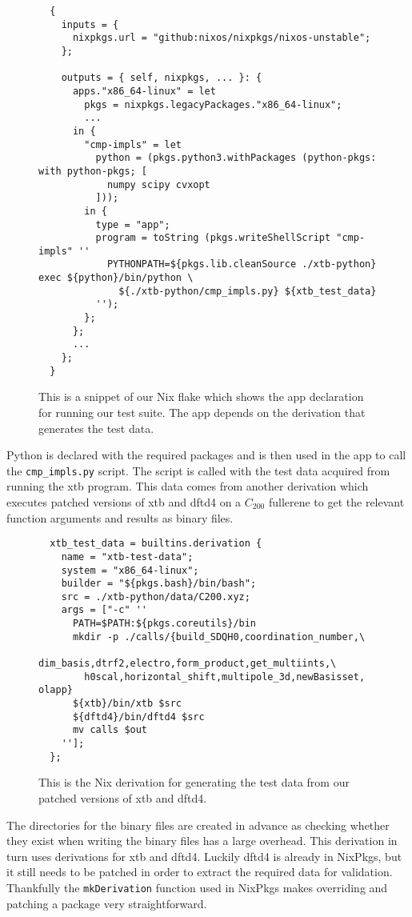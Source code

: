 \begin{figure}[H]
\begin{verbatim}
  {
    inputs = {
      nixpkgs.url = "github:nixos/nixpkgs/nixos-unstable";
    };

    outputs = { self, nixpkgs, ... }: {
      apps."x86_64-linux" = let
        pkgs = nixpkgs.legacyPackages."x86_64-linux";
        ...
      in {
        "cmp-impls" = let
          python = (pkgs.python3.withPackages (python-pkgs: with python-pkgs; [
            numpy scipy cvxopt
          ]));
        in {
          type = "app";
          program = toString (pkgs.writeShellScript "cmp-impls" ''
            PYTHONPATH=${pkgs.lib.cleanSource ./xtb-python} exec ${python}/bin/python \
              ${./xtb-python/cmp_impls.py} ${xtb_test_data}
          '');
        };
      };
      ...
    };
  }
\end{verbatim}
\caption{This is a snippet of our Nix flake which shows the app declaration for running our test suite. The app depends on the derivation that generates the test data.}
\label{fig:nix-flake}
\end{figure}

Python is declared with the required packages and is then used in the app to call the \verb|cmp_impls.py| script. The script is called with the test data acquired from running the xtb program. This data comes from another derivation which executes patched versions of xtb and dftd4 on a $C_{200}$ fullerene to get the relevant function arguments and results as binary files.

\begin{figure}[H]
\begin{verbatim}
  xtb_test_data = builtins.derivation {
    name = "xtb-test-data";
    system = "x86_64-linux";
    builder = "${pkgs.bash}/bin/bash";
    src = ./xtb-python/data/C200.xyz;
    args = ["-c" ''
      PATH=$PATH:${pkgs.coreutils}/bin
      mkdir -p ./calls/{build_SDQH0,coordination_number,\
        dim_basis,dtrf2,electro,form_product,get_multiints,\
        h0scal,horizontal_shift,multipole_3d,newBasisset, olapp}
      ${xtb}/bin/xtb $src
      ${dftd4}/bin/dftd4 $src
      mv calls $out
    ''];
  };
\end{verbatim}
\caption{This is the Nix derivation for generating the test data from our patched versions of xtb and dftd4.}
\label{fig:xtb-test-data}
\end{figure}

The directories for the binary files are created in advance as checking whether they exist when writing the binary files has a large overhead.
This derivation in turn uses derivations for xtb and dftd4. Luckily dftd4 is already in NixPkgs, but it still needs to be patched in order to extract the required data for validation. Thankfully the \verb|mkDerivation| function used in NixPkgs makes overriding and patching a package very straightforward. 

